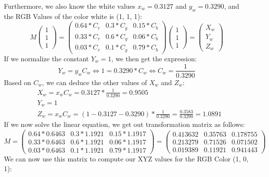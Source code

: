\documentclass{article}
\begin{document}
\begin{itemize}
        Furthermore, we also know the white values $x_w = 0.3127$ and $y_w = 0.3290$, and the RGB Values of the color white is (1, 1, 1):
        $$M \left(\begin{matrix} 1\\1\\1 \end{matrix}\right)  = \left( \begin{matrix} 0.64 * C_r & 0.3 * C_g & 0.15 * C_b \\ 0.33 * C_r & 0.6 * C_g & 0.06 * C_b \\ 0.03 * C_r & 0.1 * C_g & 0.79 * C_b \end{matrix} \right)\left(\begin{matrix} 1\\1\\1 \end{matrix}\right) = \left(\begin{matrix} X_w \\ Y_w \\ Z_w\end{matrix}\right)$$
        If we normalize the constant $Y_w = 1$, we then get the expression:
        $$Y_w = y_wC_w \Leftrightarrow 1 = 0.3290 * C_w \Leftrightarrow C_w = \frac{1}{0.3290}$$
        Based on $C_w$, we can deduce the other values of $X_w$ and $Z_w$:
        \begin{align}
            &X_w = x_wC_w = 0.3127 * \frac{1}{0.3290} = 0.9505\\
            &Y_w = 1\\
            &Z_w = x_wC_w = (1-0.3127 - 0.3290) * \frac{1}{0.3290} = \frac{0.3583}{0.3290} = 1.0891
        \end{align}
        If we now solve the linear equation, we get out transformation matrix as follows:
        $$M = \left( \begin{matrix} 0.64 * 0.6463 & 0.3 * 1.1921 & 0.15 * 1.1917 \\ 0.33 * 0.6463 & 0.6 * 1.1921 & 0.06 * 1.1917 \\ 0.03 * 0.6463 & 0.1 * 1.1921 & 0.79 * 1.1917 \end{matrix} \right) = \left( \begin{matrix} 0.413632 & 0.35763 & 0.178755 \\ 0.213279 & 0.71526 & 0.071502 \\ 0.019389 & 0.11921 & 0.941443 \end{matrix} \right)$$
        We can now use this matrix to compute our XYZ values for the RGB Color (1, 0, 1):

\end{itemize}
\end{document}
